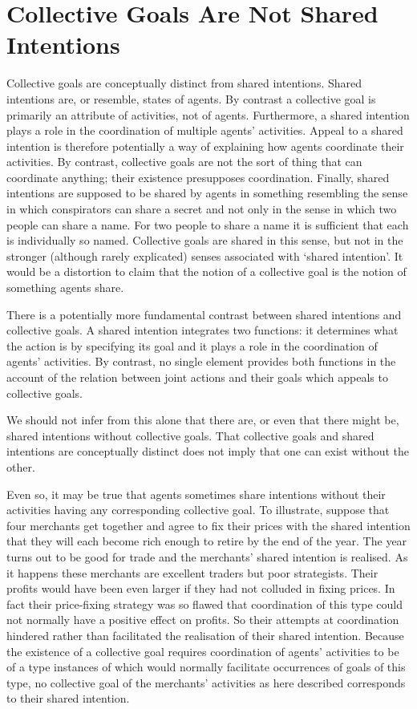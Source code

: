 \documentclass[12pt,a4paper]{extarticle}
\begin{document}
\section{Collective Goals Are Not Shared Intentions 
	\label{section_collective_vs_shared}
}
Collective goals are conceptually distinct from shared intentions.  Shared intentions are, or resemble, states of agents.  By contrast a collective goal is primarily an attribute of activities, not of agents.  Furthermore, a shared intention plays a role in the coordination of multiple agents' activities.  Appeal to a shared intention is therefore potentially a way of explaining how agents coordinate their activities.  By contrast, collective goals are not the sort of thing that can coordinate anything; their existence presupposes coordination.  Finally, shared intentions are supposed to be shared by agents in something resembling the sense in which conspirators can share a secret and not only in the sense in which two people can share a name.  
For two people to share a name it is sufficient that each is individually  so named.  
Collective goals are shared in this sense, but not in the stronger (although rarely explicated) senses associated with `shared intention'.
It would be a distortion to claim that the notion of a collective goal is the notion of something agents share.

There is a potentially more fundamental contrast between shared intentions and collective goals.  A shared intention integrates two functions: it determines what the action is by specifying its goal and it plays a role in the coordination of agents' activities.  By contrast, no single element provides both functions in the account of the relation between joint actions and their goals which appeals to collective goals.  

We should not infer from this alone that there are, or even that there might be, shared intentions without collective goals.  That collective goals and shared intentions are conceptually distinct does not imply that one can exist without the other.

Even so, it may be true that agents sometimes share intentions without their activities having any corresponding collective goal.  To illustrate, suppose that four merchants get together and agree to fix their prices with the shared intention that they will each become rich enough to retire by the end of the year.  
The year turns out to be good for trade and the merchants'  shared intention is realised.
As it happens these merchants are excellent traders but poor strategists.
Their profits would have been even larger if they had not colluded in fixing prices.
In fact their price-fixing strategy was so flawed that coordination of this type could not normally have a positive effect on profits.
So their attempts at coordination hindered rather than facilitated the realisation of their shared intention.  
Because the existence of a collective goal requires coordination of agents' activities to be of a type instances of which would normally facilitate occurrences of  goals of this type, no collective goal of the merchants' activities as here described corresponds to their shared intention.
\end{document}
